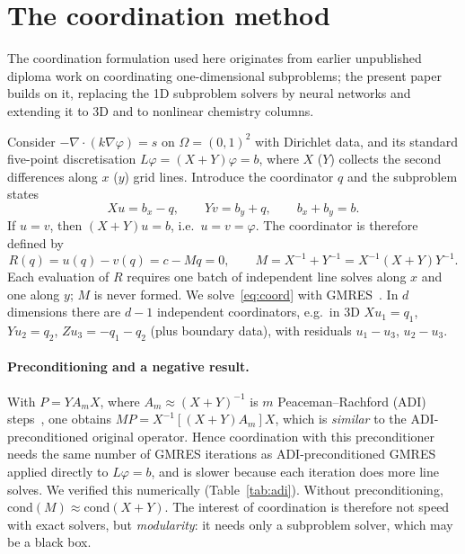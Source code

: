 \documentclass[11pt]{article}
\begin{document}
\section{The coordination method}
\label{sec:method}

The coordination formulation used here originates from earlier unpublished diploma work on
coordinating one-dimensional subproblems; the present paper builds on it, replacing the 1D
subproblem solvers by neural networks and extending it to 3D and to nonlinear chemistry columns.

Consider $-\nabla\cdot(k\nabla\varphi) = s$ on $\Omega = (0,1)^2$ with Dirichlet data, and
its standard five-point discretisation $L\varphi = (X+Y)\varphi = b$, where $X$ ($Y$) collects
the second differences along $x$ ($y$) grid lines. Introduce the coordinator $q$ and the
subproblem states
\begin{equation}
  X u = b_x - q, \qquad Y v = b_y + q, \qquad b_x + b_y = b. \label{eq:split}
\end{equation}
If $u = v$, then $(X+Y)u = b$, i.e.\ $u = v = \varphi$. The coordinator is therefore defined by
\begin{equation}
  R(q) = u(q) - v(q) = c - Mq = 0,\qquad M = X^{-1} + Y^{-1} = X^{-1}(X+Y)Y^{-1}. \label{eq:coord}
\end{equation}
Each evaluation of $R$ requires one batch of independent line solves along $x$ and one along
$y$; $M$ is never formed. We solve~\eqref{eq:coord} with GMRES~\cite{saad1986gmres}. In $d$
dimensions there are $d-1$ independent coordinators, e.g.\ in 3D
$X u_1 = q_1$, $Y u_2 = q_2$, $Z u_3 = -q_1 - q_2$ (plus boundary data), with residuals
$u_1-u_3$, $u_2-u_3$.

\paragraph{Preconditioning and a negative result.}
With $P = Y A_m X$, where $A_m \approx (X+Y)^{-1}$ is $m$ Peaceman--Rachford (ADI)
steps~\cite{peaceman1955}, one obtains $MP = X^{-1}[(X+Y)A_m]X$, which is \emph{similar} to the
ADI-preconditioned original operator. Hence coordination with this preconditioner needs the
same number of GMRES iterations as ADI-preconditioned GMRES applied directly to $L\varphi=b$,
and is slower because each iteration does more line solves. We verified this numerically
(Table~\ref{tab:adi}). Without preconditioning, $\mathrm{cond}(M)\approx\mathrm{cond}(X+Y)$.
The interest of coordination is therefore not speed with exact solvers, but \emph{modularity}:
it needs only a subproblem solver, which may be a black box.
\end{document}
